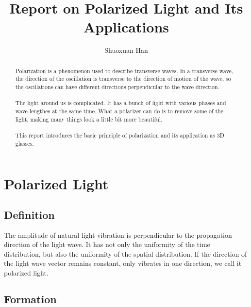 \documentclass[]{report}
\title{Report on Polarized Light and Its Applications}
\author{Shuoxuan Han}
\begin{document}
\maketitle

\begin{abstract}
	\paragraph{} Polarization is a phenomenon used to describe transverse waves. In a transverse wave, the direction of the oscillation is transverse to the direction of motion of the wave, so the oscillations can have different directions perpendicular to the wave direction\cite{Avadhanulu.(1992)}.
	\paragraph{} The light around us is complicated. It has a bunch of light with various phases and wave lengthes at the same time. What a polarizer can do is to remove some of the light, making many things look a little bit more beautiful.
	\paragraph{} This report introduces the basic principle of polarization and its application as 3D glasses.
\end{abstract}

\section*{Polarized Light}
\subsection*{Definition} The amplitude of natural light vibration is perpendicular to the propagation direction of the light wave. It has not only the uniformity of the time distribution, but also the uniformity of the spatial distribution. If the direction of the light wave vector remains constant, only vibrates in one direction, we call it polarized light. 
\subsection*{Formation}
\end{document}
